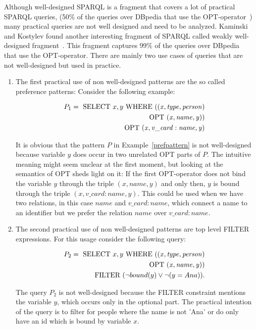 Although well-designed SPARQL is a fragment that covers a lot of practical SPARQL
queries, (50\% of the queries over DBpedia that use the
OPT-operator~\cite{Picalausa})
many practical queries are not well designed and need to be analyzed. 
Kaminski and Kostylev found another
interesting fragment of SPARQL called weakly well-designed fragment~\cite{kaminski_bwd}. This
fragment captures 99\% of the queries over DBpedia that use the OPT-operator. 
There are mainly two use cases of queries that are not well-designed but used in
practice.
\begin{enumerate}
	\item The first practical use of non well-designed patterns are the so called
		preference patterns:
		Consider the following example:
		\begin{example}\label{prefpattern}
			\begin{align*}
				P_1 =	\mbox{ SELECT } x, y  \mbox{ WHERE }
				((\mathit{x,type,person})\\ \mbox{ OPT }
				(\mathit{x,name,y}))\\
				\mbox{ OPT } (\mathit{x,v\_card:name,y})
			\end{align*}
		\end{example}
		It is obvious that the pattern $P$ in Example~\ref{prefpattern} 
		is not well-designed because variable
		$y$ does occur in two unrelated OPT parts of $P$. The
		intuitive meaning might seem unclear at the first moment, 
		but looking at the semantics of OPT sheds light on it: If the first OPT-operator
		does not bind the variable $y$ through the triple $\mathit{(x,
		name, y)}$ 
		and only then, $y$ is bound through the triple $(x, v\_card:name, y)$.
		This could be used when we have two relations, in this case
		$\mathit{name}$
		and $v\_card:name$, which connect a name to an identifier but we prefer
		the relation $\mathit{name}$ over $v\_card:name$.

	\item The second practical use of non well-designed patterns are top level
		FILTER expressions. For this usage consider the following query:
		\begin{example}\label{toplevelfilter}
			\begin{align*}
				P_2 = \mbox{ SELECT } x,y \mbox{ WHERE } ((\mathit{x,type,person})\\
				\mbox{ OPT } (\mathit{x,
				name,y}))\\ 
				\mbox{ FILTER }(\neg bound(y) \lor \neg(y = Ana)).
			\end{align*}
		\end{example}
		The query $P_2$ is not well-designed because the FILTER constraint
		mentions the variable $y$, which occurs only in the optional
		part. The practical intention of the query is to filter for people
		where the name is not 'Ana' or do only have an id which is bound by
		variable $x$. 
\end{enumerate}

